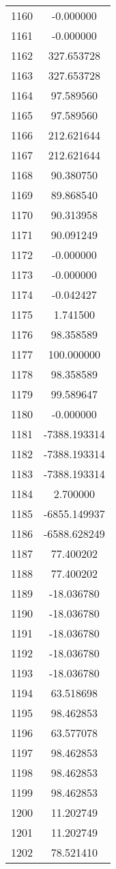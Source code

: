 \documentclass[12pt]{article}
\begin{document}
\begin{longtable}{@{}cc@{}}
1160 & -0.000000 \\
1161 & -0.000000 \\
1162 & 327.653728 \\
1163 & 327.653728 \\
1164 & 97.589560 \\
1165 & 97.589560 \\
1166 & 212.621644 \\
1167 & 212.621644 \\
1168 & 90.380750 \\
1169 & 89.868540 \\
1170 & 90.313958 \\
1171 & 90.091249 \\
1172 & -0.000000 \\
1173 & -0.000000 \\
1174 & -0.042427 \\
1175 & 1.741500 \\
1176 & 98.358589 \\
1177 & 100.000000 \\
1178 & 98.358589 \\
1179 & 99.589647 \\
1180 & -0.000000 \\
1181 & -7388.193314 \\
1182 & -7388.193314 \\
1183 & -7388.193314 \\
1184 & 2.700000 \\
1185 & -6855.149937 \\
1186 & -6588.628249 \\
1187 & 77.400202 \\
1188 & 77.400202 \\
1189 & -18.036780 \\
1190 & -18.036780 \\
1191 & -18.036780 \\
1192 & -18.036780 \\
1193 & -18.036780 \\
1194 & 63.518698 \\
1195 & 98.462853 \\
1196 & 63.577078 \\
1197 & 98.462853 \\
1198 & 98.462853 \\
1199 & 98.462853 \\
1200 & 11.202749 \\
1201 & 11.202749 \\
1202 & 78.521410 \\

\end{longtable}
\end{document}
